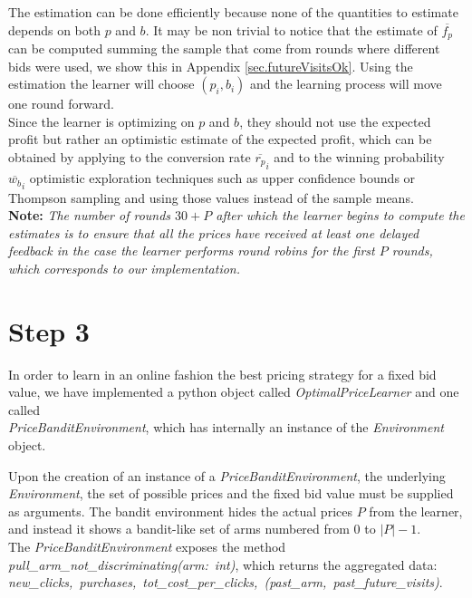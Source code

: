 \documentclass[11pt]{article} %
\begin{document}
The estimation can be done efficiently because none of the quantities to estimate depends on both $p$ and $b$. {\color{red}It may be non trivial to notice that the estimate of $\overline{f_p}$ can be computed summing the sample that come from rounds where different bids were used, we show this in Appendix \ref{sec.futureVisitsOk}}. Using the estimation the learner will choose $(p_i,b_i)$ and the learning process will move one round forward.\\
Since the learner is optimizing on $p$ and $b$, they should not use the expected profit but rather an optimistic estimate of the expected profit, which can be obtained by applying to the conversion rate $\overline{r_p}_i$ and to the winning probability $\overline{w_b}_i$ optimistic exploration techniques such as upper confidence bounds or Thompson sampling and using those values instead of the sample means.\\

\textbf{Note:} \textit{The number of rounds $30+P$ after which the learner begins to compute the estimates is to ensure that all the prices have received at least one delayed feedback in the case the learner performs round robins for the first $P$ rounds, which corresponds to our implementation.}


\clearpage
\section{Step 3}
In order to learn in an online fashion the best pricing strategy for a fixed bid value, we have implemented a python object called \textit{OptimalPriceLearner} and one called\\ \textit{PriceBanditEnvironment}, which has internally an instance of the \textit{Environment} object. 

Upon the creation of an instance of a \textit{PriceBanditEnvironment}, the underlying\\ \textit{Environment}, the set of possible prices and the fixed bid value must be supplied as arguments. The bandit environment hides the actual prices $P$ from the learner, and instead it shows a bandit-like set of arms numbered from $0$ to $|P|-1$.\\

The \textit{PriceBanditEnvironment} exposes the method \mbox{\textit{pull\_arm\_not\_discriminating(arm: int)}}, which returns the aggregated data:\\
\mbox{\textit{new\_clicks, purchases, tot\_cost\_per\_clicks, (past\_arm, past\_future\_visits)}}.\\
\end{document}
